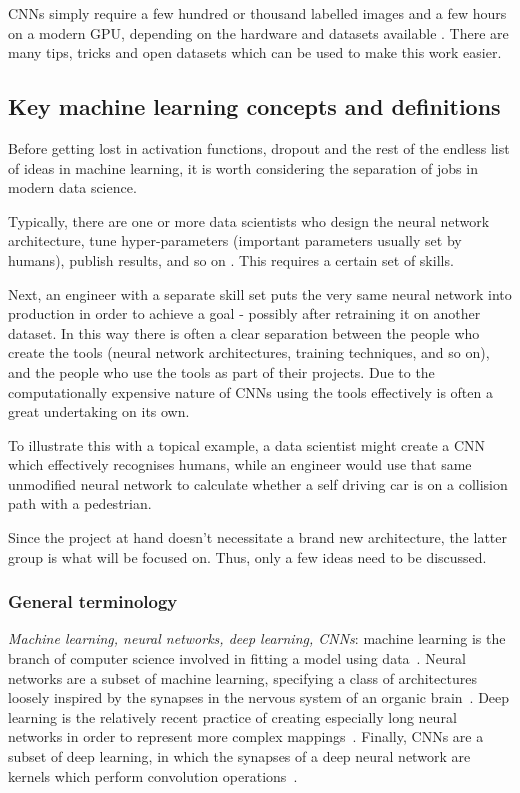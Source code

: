 CNNs simply require a few hundred or thousand labelled images and a few hours on a modern GPU, depending on the hardware and datasets available \cite{website:fastai_train_times}. There are many tips, tricks and open datasets which can be used to make this work easier.

\subsection{Key machine learning concepts and definitions}
Before getting lost in activation functions, dropout and the rest of the endless list of ideas in machine learning, it is worth considering the separation of jobs in modern data science.

Typically, there are one or more data scientists who design the neural network architecture, tune hyper-parameters (important parameters usually set by humans), publish results, and so on \cite{website:separation_of_ML_roles}. This requires a certain set of skills.

Next, an engineer with a separate skill set puts the very same neural network into production in order to achieve a goal - possibly after retraining it on another dataset. In this way there is often a clear separation between the people who create the tools (neural network architectures, training techniques, and so on), and the people who use the tools as part of their projects. Due to the computationally expensive nature of CNNs \cite{huang2017speed} using the tools effectively is often a great undertaking on its own.

To illustrate this with a topical example, a data scientist might create a CNN which effectively recognises humans, while an engineer would use that same unmodified neural network to calculate whether a self driving car is on a collision path with a pedestrian.

Since the project at hand doesn't necessitate a brand new architecture, the latter group is what will be focused on. Thus, only a few ideas need to be discussed.

\subsubsection{General terminology}

\textit{Machine learning, neural networks, deep learning, CNNs}: machine learning is the branch of computer science involved in fitting a model using data~\cite{kohavi1998glossary}. Neural networks are a subset of machine learning, specifying a class of architectures loosely inspired by the synapses in the nervous system of an organic brain~\cite{hopfield1988artificial}. Deep learning is the relatively recent practice of creating especially long neural networks in order to represent more complex mappings~\cite{schmidhuber2015deep}. Finally, CNNs are a subset of deep learning, in which the synapses of a deep neural network are kernels which perform convolution operations~\cite{website:cs231n_CNNs}.

